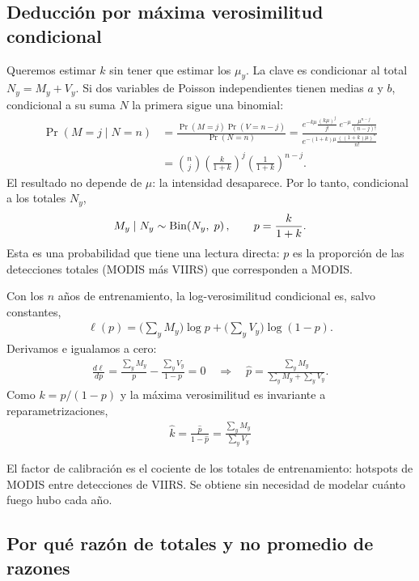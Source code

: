 \subsection{Deducción por máxima verosimilitud condicional}

Queremos estimar $k$ sin tener que estimar los $\mu_y$. La clave es condicionar al total $N_y=M_y+V_y$. Si dos variables de Poisson independientes tienen medias $a$ y $b$, condicional a su suma $N$ la primera sigue una binomial:
\begin{align*}
  \Pr(M=j\mid N=n)
  &=\frac{\Pr(M=j)\Pr(V=n-j)}{\Pr(N=n)}
  =\frac{e^{-k\mu}\frac{(k\mu)^j}{j!}\;e^{-\mu}\frac{\mu^{n-j}}{(n-j)!}}{e^{-(1+k)\mu}\frac{((1+k)\mu)^n}{n!}}\\[4pt]
  &=\binom{n}{j}\left(\frac{k}{1+k}\right)^{j}\left(\frac{1}{1+k}\right)^{n-j}.
\end{align*}
El resultado no depende de $\mu$: la intensidad desaparece. Por lo tanto, condicional a los totales $N_y$,
\begin{align*}
  M_y\mid N_y\sim\operatorname{Bin}\!\left(N_y,\;p\right),\qquad p=\frac{k}{1+k}.
\end{align*}
Esta es una probabilidad que tiene una lectura directa: $p$ es la proporción de las detecciones totales (MODIS más VIIRS) que corresponden a MODIS.

Con los $n$ años de entrenamiento, la log-verosimilitud condicional es, salvo constantes,
\begin{align*}
  \ell(p)=\Big(\sum_y M_y\Big)\log p+\Big(\sum_y V_y\Big)\log(1-p).
\end{align*}
Derivamos e igualamos a cero:
\begin{align*}
  \frac{d\ell}{dp}=\frac{\sum_y M_y}{p}-\frac{\sum_y V_y}{1-p}=0
  \quad\Longrightarrow\quad
  \widehat{p}=\frac{\sum_y M_y}{\sum_y M_y+\sum_y V_y}.
\end{align*}
Como $k=p/(1-p)$ y la máxima verosimilitud es invariante a reparametrizaciones,
\begin{align}
  \boxed{\;\widehat{k}=\frac{\widehat p}{1-\widehat p}=\frac{\sum_y M_y}{\sum_y V_y}\;}\label{eq:khat}
\end{align}

\begin{ideaclave}
El factor de calibración es el cociente de los totales de entrenamiento: hotspots de MODIS entre detecciones de VIIRS. Se obtiene sin necesidad de modelar cuánto fuego hubo cada año.
\end{ideaclave}

\subsection{Por qué razón de totales y no promedio de razones}

